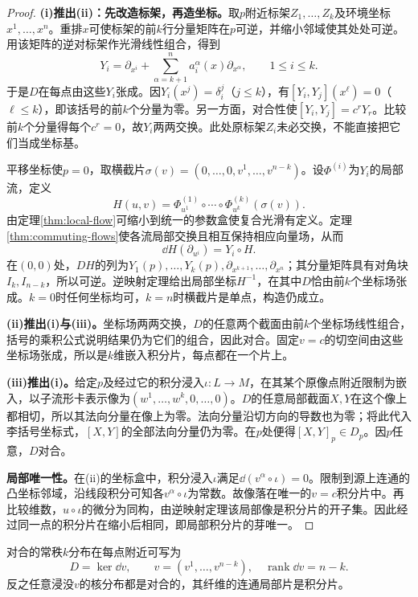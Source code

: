 \begin{proof}
\textbf{(i)推出(ii)：先改造标架，再造坐标。}取$p$附近标架$Z_1,\ldots,Z_k$及环境坐标$x^1,\ldots,x^n$。重排$x$可使标架的前$k$行分量矩阵在$p$可逆，并缩小邻域使其处处可逆。用该矩阵的逆对标架作光滑线性组合，得到
\[
 Y_i=\partial_{x^i}+\sum_{\alpha=k+1}^n
 a_i^\alpha(x)\partial_{x^\alpha},\qquad 1\leq i\leq k.
\]
于是$D$在每点由这些$Y_i$张成。因$Y_i(x^j)=\delta_i^j$（$j\leq k$），有$[Y_i,Y_j](x^\ell)=0$（$\ell\leq k$），即该括号的前$k$个分量为零。另一方面，对合性使$[Y_i,Y_j]=c^rY_r$。比较前$k$个分量得每个$c^r=0$，故$Y_i$两两交换。此处原标架$Z_i$未必交换，不能直接把它们当成坐标基。

平移坐标使$p=0$，取横截片$\sigma(v)=(0,\ldots,0,v^1,\ldots,v^{n-k})$。设$\Phi^{(i)}$为$Y_i$的局部流，定义
\[
 H(u,v)=\Phi^{(1)}_{u^1}\circ\cdots\circ
 \Phi^{(k)}_{u^k}(\sigma(v)).
\]
由定理\ref{thm:local-flow}可缩小到统一的参数盒使复合光滑有定义。定理\ref{thm:commuting-flows}使各流局部交换且相互保持相应向量场，从而
\[
 \dd H(\partial_{u^i})=Y_i\circ H.
\]
在$(0,0)$处，$DH$的列为$Y_1(p),\ldots,Y_k(p),\partial_{x^{k+1}},\ldots,\partial_{x^n}$；其分量矩阵具有对角块$I_k,I_{n-k}$，所以可逆。逆映射定理给出局部坐标$H^{-1}$，在其中$D$恰由前$k$个坐标场张成。$k=0$时任何坐标均可，$k=n$时横截片是单点，构造仍成立。

\textbf{(ii)推出(i)与(iii)。}坐标场两两交换，$D$的任意两个截面由前$k$个坐标场线性组合，括号的乘积公式说明结果仍为它们的组合，因此对合。固定$v=c$的切空间由这些坐标场张成，所以是$k$维嵌入积分片，每点都在一个片上。

\textbf{(iii)推出(i)。}给定$p$及经过它的积分浸入$\iota:L\to M$，在其某个原像点附近限制为嵌入，以子流形卡表示像为$(w^1,\ldots,w^k,0,\ldots,0)$。$D$的任意局部截面$X,Y$在这个像上都相切，所以其法向分量在像上为零。法向分量沿切方向的导数也为零；将此代入李括号坐标式，$[X,Y]$的全部法向分量仍为零。在$p$处便得$[X,Y]_p\in D_p$。因$p$任意，$D$对合。

\textbf{局部唯一性。}在(ii)的坐标盒中，积分浸入$\iota$满足$\dd(v^\alpha\circ\iota)=0$。限制到源上连通的凸坐标邻域，沿线段积分可知各$v^\alpha\circ\iota$为常数。故像落在唯一的$v=c$积分片中。再比较维数，$u\circ\iota$的微分为同构，由逆映射定理该局部像是积分片的开子集。因此经过同一点的积分片在缩小后相同，即局部积分片的芽唯一。
\end{proof}
\begin{corollary}[局部第一积分]\label{cor:first-integrals}
对合的常秩$k$分布在每点附近可写为
\[
 D=\ker\dd v,\qquad v=(v^1,\ldots,v^{n-k}),\quad
 \operatorname{rank}\dd v=n-k.
\]
反之任意浸没$v$的核分布都是对合的，其纤维的连通局部片是积分片。
\end{corollary}
